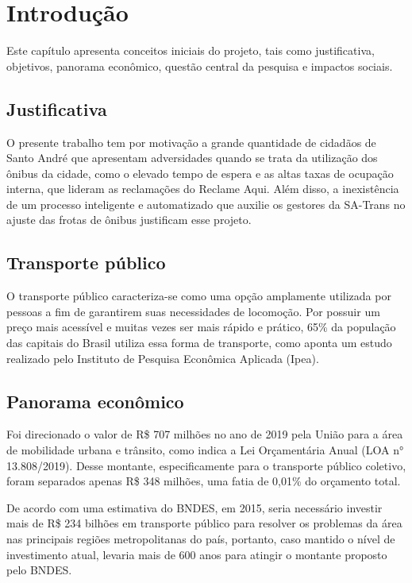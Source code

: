 \chapter{Introdução}
\label{Cap:Intro}
\indent
\par Este capítulo apresenta conceitos iniciais do projeto, tais como justificativa, objetivos, panorama econômico, questão central da pesquisa e impactos sociais.


\section{Justificativa}
\indent
\par O presente trabalho tem por motivação a grande quantidade de cidadãos de Santo André que apresentam adversidades quando se trata da utilização dos ônibus da cidade, como o elevado tempo de espera e as altas taxas de ocupação interna, que lideram as reclamações do Reclame Aqui. Além disso, a inexistência de um processo inteligente e automatizado que auxilie os gestores da SA-Trans no ajuste das frotas de ônibus justificam esse projeto.

\section{Transporte público}
\indent
\par O transporte público caracteriza-se como uma opção amplamente utilizada por pessoas a fim de garantirem suas necessidades de locomoção. Por possuir um preço mais acessível e muitas vezes ser mais rápido e prático, 65\% da população das capitais do Brasil utiliza essa forma de transporte, como aponta um estudo realizado pelo Instituto de Pesquisa Econômica Aplicada (Ipea).

\section{Panorama econômico}
\indent
\par Foi direcionado o valor de R\$ 707 milhões no ano de 2019 pela União para a área de mobilidade urbana e trânsito, como indica a Lei Orçamentária Anual (LOA n° 13.808/2019). Desse montante, especificamente para o transporte público coletivo, foram separados apenas R\$ 348 milhões, uma fatia de 0,01\% do orçamento total.
\par De acordo com uma estimativa do BNDES, em 2015, seria necessário investir mais de R\$ 234 bilhões em transporte público para resolver os problemas da área nas principais regiões metropolitanas do país, portanto, caso mantido o nível de investimento atual, levaria mais de 600 anos para atingir o montante proposto pelo BNDES.


